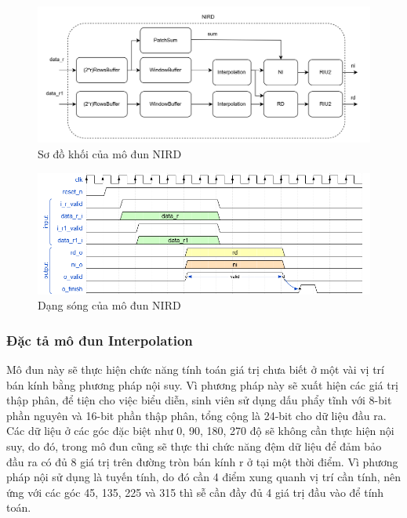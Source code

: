 \begin{figure}[!ht]
    \centering
    \includegraphics[width=\linewidth]{figures/nirdArch.png}
    \caption{Sơ đồ khối của mô đun NIRD}
    \label{fig:nirdArch}
\end{figure}
\begin{figure}[!ht]
    \centering
    \includegraphics[width=\linewidth]{figures/nird.png}
    \caption{Dạng sóng của mô đun NIRD}
    \label{fig:nird}
\end{figure}

\subsubsection{Đặc tả mô đun Interpolation}
Mô đun này sẽ thực hiện chức năng tính toán giá trị chưa biết ở một vài vị trí bán kính bằng phương pháp nội suy. Vì phương pháp này sẽ xuất hiện các giá trị thập phân, để tiện cho việc biểu diễn, sinh viên sử dụng dấu phẩy tĩnh với 8-bit phần nguyên và 16-bit phần thập phân, tổng cộng là 24-bit cho dữ liệu đầu ra. Các dữ liệu ở các góc đặc biệt như 0, 90, 180, 270 độ sẽ không cần thực hiện nội suy, do đó, trong mô đun cũng sẽ thực thi chức năng đệm dữ liệu để đảm bảo đầu ra có đủ 8 giá trị trên đường tròn bán kính r ở tại một thời điểm. Vì phương pháp nội sử dụng là tuyến tính, do đó cần 4 điểm xung quanh vị trí cần tính, nên ứng với các góc 45, 135, 225 và 315 thì sễ cần đầy đủ 4 giá trị đầu vào để tính toán.

